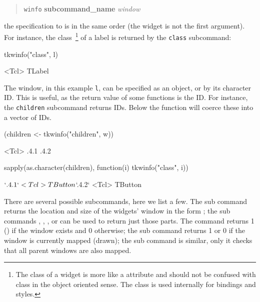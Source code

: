 \begin{quotation}
\texttt{winfo} \textbf{subcommand\_name} \textit{window}  
\end{quotation}
the specification to  is in the same order (the
widget is not the first argument). For instance, the
class~\footnote{The class of a widget is more like a attribute and should
  not be confused with class in the object oriented sense. The class
  is used internally for bindings and styles.} of a label
is returned by the \texttt{class} subcommand:

\begin{Schunk}
\begin{Sinput}
 tkwinfo("class", l)
\end{Sinput}
\begin{Soutput}
<Tcl> TLabel 
\end{Soutput}
\end{Schunk}
%

The window, in this example \texttt{l}, can be specified as an \R\/
object, or by its character ID. This is useful, as the return value of
some functions is the ID. For instance, the \texttt{children}
subcommand returns IDs. Below the  function will
coerce these into a vector of IDs.


\begin{Schunk}
\begin{Sinput}
 (children <- tkwinfo("children", w))
\end{Sinput}
\begin{Soutput}
<Tcl> .4.1 .4.2 
\end{Soutput}
\begin{Sinput}
 sapply(as.character(children), function(i) tkwinfo("class", i))
\end{Sinput}
\begin{Soutput}
$`.4.1`
<Tcl> TButton 

$`.4.2`
<Tcl> TButton 
\end{Soutput}
\end{Schunk}

There are several possible subcommands, here we list a few. The
 sub command returns the location and
size of the widgets' window in the form ;
the sub commands ,
, , or
 can be used to return just those parts. The
 command returns 1 () if the
window exists and 0 otherwise; the  sub
command returns 1 or 0 if the window is currently mapped (drawn); the
 sub command is similar, only it checks
that all parent windows are also mapped.  

